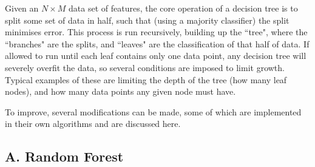 \documentclass[onecolumn,prl,aps,10pt]{revtex4}
\begin{document}
Given an $N \times M$ data set of features, the core operation of a decision tree is to split some set of data in half, such that (using a majority classifier) the split minimises error. This process is run recursively, building up the \textquotedblleft tree", where the \textquotedblleft branches" are the splits, and \textquotedblleft leaves" are the classification of that half of data. If allowed to run until each leaf contains only one data point, any decision tree will severely overfit the data, so several conditions are imposed to limit growth. Typical examples of these are limiting the depth of the tree (how many leaf nodes), and how many data points any given node must have. 

To improve, several modifications can be made, some of which are implemented in their own algorithms and are discussed here.

\subsection{A. Random Forest}
 
\end{document}
